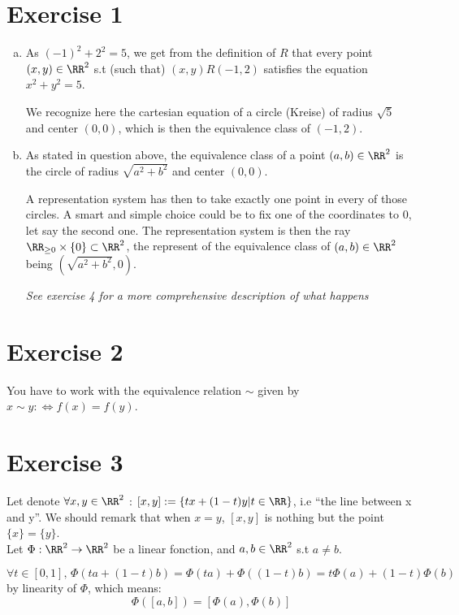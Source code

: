 \section{Exercise 1}

\begin{enumerate}[a)]
 \item As $(-1)^2+2^2=5$, we get from the definition of $R$ that every point $(x,y)\in\RR^2$ s.t (such that) $(x,y)R(-1,2)$ satisfies the equation $x^2+y^2=5$.
 
 We recognize here the cartesian equation of a circle (Kreise) of radius $\sqrt{5}$ and center $(0,0)$, which is then the equivalence class of $(-1,2)$.
 
 \item As stated in question above, the equivalence class of a point $(a,b)\in\RR^2$ is the circle of radius $\sqrt{a^2+b^2}$ and center $(0,0)$.
 
 A representation system has then to take exactly one point in every of those circles. A smart and simple choice could be to fix one of the coordinates to 0, let say the second one. The representation system is then the ray $\RR_{\geq 0}\times \{0\}\subset \RR^2$, the represent of the equivalence class of $(a,b)\in\RR^2$ being $(\sqrt{a^2+b^2}, 0)$.
 
 \textit{See exercise 4 for a more comprehensive description of what happens}
\end{enumerate}

\section{Exercise 2}

You have to work with the equivalence relation $\sim$ given by $x\sim y:\iff f(x)=f(y)$.

\section{Exercise 3}

Let denote $\forall x,y\in\RR^2$ : $[x,y]:=\{tx+(1-t)y|t\in\RR\}$, i.e ``the line between x and y''.
We should remark that when $x=y$, $[x,y]$ is nothing but the point $\{x\}=\{y\}$.\\

Let $\Phi:\RR^2\to\RR^2$ be a linear fonction, and $a, b\in\RR^2$ s.t $a\neq b$.

$\forall t\in [0,1],\, \Phi(ta+(1-t)b)=\Phi(ta)+\Phi((1-t)b)=t\Phi(a)+(1-t)\Phi(b)$ by linearity of $\Phi$, which means:
$$
 \Phi([a,b])=[\Phi(a),\Phi(b)]
$$


